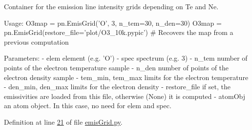 \begin{DoxyVerb}Container for the emission line intensity grids depending on Te and Ne.

Usage:
    O3map = pn.EmisGrid('O', 3, n_tem=30, n_den=30)
    O3map = pn.EmisGrid(restore_file='plot/O3_10k.pypic') # Recovers the map from a previous computation

Parameters:
    - elem               element (e.g. 'O')
    - spec               spectrum (e.g. 3)
    - n_tem              number of points of the electron temperature sample
    - n_den              number of points of the electron density sample
    - tem_min, tem_max   limits for the electron temperature
    - den_min, den_max   limits for the electron density
    - restore_file       if set, the emissivities are loaded from this file, 
                 otherwise (None) it is computed
    - atomObj            an atom object. In this case, no need for elem and spec.\end{DoxyVerb}
 

Definition at line \hyperlink{emis_grid_8py_source_l00021}{21} of file \hyperlink{emis_grid_8py_source}{emis\-Grid.\-py}.


